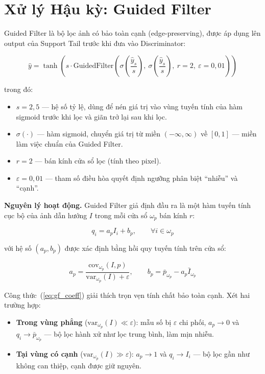 \section{Xử lý Hậu kỳ: Guided Filter}
\label{sec:guided_filter}

Guided Filter \cite{He2013GuidedFilter} là bộ lọc ảnh có bảo toàn cạnh (edge-preserving), được áp dụng lên output của Support Tail trước khi đưa vào Discriminator:

\begin{equation}
\label{eq:guided_filter}
\widehat{y} = \tanh\!\left(s \cdot \text{GuidedFilter}\!\left(\sigma\!\left(\frac{\widehat{y}_s}{s}\right),\ \sigma\!\left(\frac{\widehat{y}_s}{s}\right),\ r{=}2,\ \varepsilon{=}0{,}01\right)\right)
\end{equation}

\noindent trong đó:
\begin{itemize}
    \item $s = 2{,}5$ --- hệ số tỷ lệ, dùng để nén giá trị vào vùng tuyến tính của hàm sigmoid trước khi lọc và giãn trở lại sau khi lọc.
    \item $\sigma(\cdot)$ --- hàm sigmoid, chuyển giá trị từ miền $(-\infty, \infty)$ về $[0,1]$ --- miền làm việc chuẩn của Guided Filter.
    \item $r = 2$ --- bán kính cửa sổ lọc (tính theo pixel).
    \item $\varepsilon = 0{,}01$ --- tham số điều hòa quyết định ngưỡng phân biệt ``nhiễu'' và ``cạnh''.
\end{itemize}

\textbf{Nguyên lý hoạt động.} Guided Filter giả định đầu ra là một hàm tuyến tính cục bộ của ảnh dẫn hướng $I$ trong mỗi cửa sổ $\omega_p$ bán kính $r$:

\begin{equation}
\label{eq:gf_linear}
q_i = a_p I_i + b_p, \qquad \forall i \in \omega_p
\end{equation}

\noindent với hệ số $(a_p, b_p)$ được xác định bằng hồi quy tuyến tính trên cửa sổ:

\begin{equation}
\label{eq:gf_coeff}
a_p = \frac{\text{cov}_{\omega_p}(I, p)}{\text{var}_{\omega_p}(I) + \varepsilon}, \qquad b_p = \bar{p}_{\omega_p} - a_p \bar{I}_{\omega_p}
\end{equation}

Công thức~(\ref{eq:gf_coeff}) giải thích trọn vẹn tính chất bảo toàn cạnh. Xét hai trường hợp:
\begin{itemize}
    \item \textbf{Trong vùng phẳng} ($\text{var}_{\omega_p}(I) \ll \varepsilon$): mẫu số bị $\varepsilon$ chi phối, $a_p \to 0$ và $q_i \to \bar{p}_{\omega_p}$ --- bộ lọc hành xử như lọc trung bình, làm mịn nhiễu.
    \item \textbf{Tại vùng có cạnh} ($\text{var}_{\omega_p}(I) \gg \varepsilon$): $a_p \to 1$ và $q_i \to I_i$ --- bộ lọc gần như không can thiệp, cạnh được giữ nguyên.
\end{itemize}

